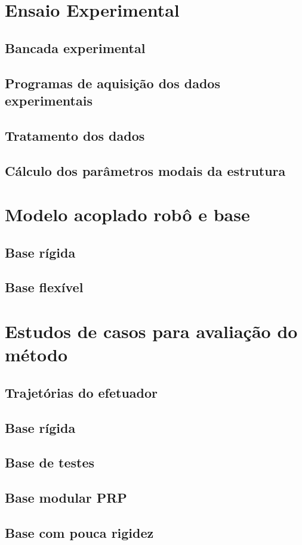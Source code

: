 \section{Ensaio Experimental}

\subsection{Bancada experimental}

\subsection{Programas de aquisição dos dados experimentais}

\subsection{Tratamento dos dados}

\subsection{Cálculo dos parâmetros modais da estrutura}


\section{Modelo acoplado robô e base}

\subsection{Base rígida}

\subsection{Base flexível}


\section{Estudos de casos para avaliação do método}

\subsection{Trajetórias do efetuador}

\subsection{Base rígida}

\subsection{Base de testes}

\subsection{Base modular PRP}

\subsection{Base com pouca rigidez}
